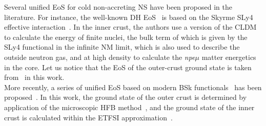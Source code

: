 Several unified EoS for cold non-accreting NS have been proposed in the 
literature. For instance, the 
well-known DH EoS~\cite{Douchin2001} is based on the Skyrme SLy4 effective
interaction~\cite{Chabanat1998}. In the inner crust, the authors use a version 
of the CLDM to calculate the energy of finite nuclei, the bulk term of which is 
given by the SLy4 functional in the infinite NM limit, which is also used to 
describe the outside neutron gas, and at high density to calculate 
the \textit{npe$\mu$} matter energetics in the core. Let us notice that the EoS
of the outer-crust ground state is taken from~\cite{Haensel1994} in this 
work.\\
More recently, a series of unified EoS based on modern BSk 
functionals~\cite{Goriely2013} has been proposed~\cite{Pearson2018}. In this
work, the ground state of the outer crust is determined by application of the
microscopic HFB method~\cite{Samyn2002}, and the ground state of the inner 
crust is calculated within the ETFSI approximation~\cite{Onsi2008}. 

